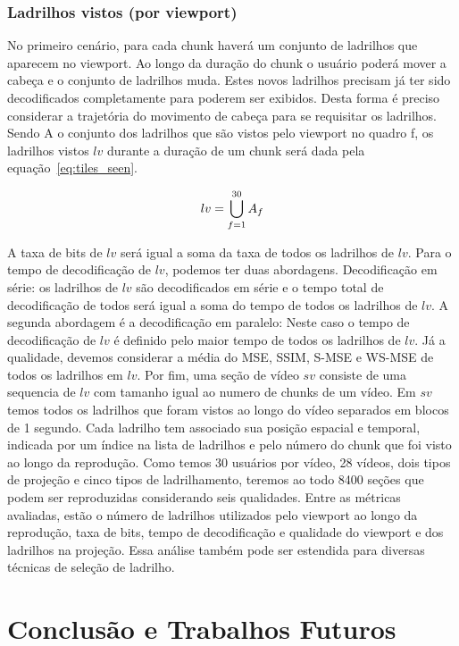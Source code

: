 \subsection{Ladrilhos vistos (por viewport)}

No primeiro cenário, para cada chunk haverá um conjunto de ladrilhos que aparecem no viewport. Ao longo da duração do chunk o usuário poderá mover a cabeça e o conjunto de ladrilhos muda. Estes novos ladrilhos precisam já ter sido decodificados completamente para poderem ser exibidos. Desta forma é preciso considerar a trajetória do movimento de cabeça para se requisitar os ladrilhos. Sendo A o conjunto dos ladrilhos que são vistos pelo viewport no quadro f, os ladrilhos vistos $lv$ durante a duração de um chunk será dada pela equação~\ref{eq:tiles_seen}.

\begin{equation}
        lv=\bigcup^{30}_{f=1} A_f \\    
        \label{eq:tiles_seen}
\end{equation}

A taxa de bits de $lv$ será igual a soma da taxa de todos os ladrilhos de $lv$. Para o tempo de decodificação de $lv$, podemos ter duas abordagens. Decodificação em série: os ladrilhos de $lv$ são decodificados em série e o tempo total de decodificação de todos será igual a soma do tempo de todos os ladrilhos de $lv$. A segunda abordagem é a decodificação em paralelo: Neste caso o tempo de decodificação de $lv$ é definido pelo maior tempo de todos os ladrilhos de $lv$. Já a qualidade, devemos considerar a média do MSE, SSIM, S-MSE e WS-MSE de todos os ladrilhos em $lv$. Por fim, uma seção de vídeo $sv$ consiste de uma sequencia de $lv$ com tamanho igual ao numero de chunks de um vídeo. Em $sv$ temos todos os ladrilhos que foram vistos ao longo do vídeo separados em blocos de 1 segundo. Cada ladrilho tem associado sua posição espacial e temporal, indicada por um índice na lista de ladrilhos e pelo número do chunk que foi visto ao longo da reprodução. Como temos 30 usuários por vídeo, 28 vídeos, dois tipos de projeção e cinco tipos de ladrilhamento, teremos ao todo 8400 seções que podem ser reproduzidas considerando seis qualidades. Entre as métricas avaliadas, estão o número de ladrilhos utilizados pelo viewport ao longo da reprodução, taxa de bits, tempo de decodificação e qualidade do viewport e dos ladrilhos na projeção. Essa análise também pode ser estendida para diversas técnicas de seleção de ladrilho.


\chapter{Conclusão e Trabalhos Futuros}\label{Cap:Conclusion}

